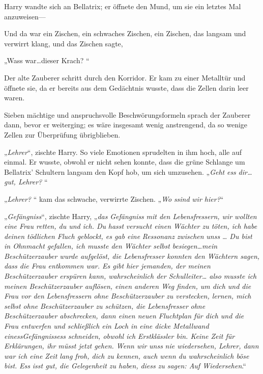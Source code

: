 {Harry wandte sich an Bellatrix; er öffnete den Mund, um sie ein letztes Mal anzuweisen—

Und da war ein Zischen, ein schwaches Zischen, ein Zischen, das langsam und verwirrt klang, und das Zischen sagte,

„Wass war…dieser Krach? “

Der alte Zauberer schritt durch den Korridor. Er kam zu einer Metalltür und öffnete sie, da er bereits aus dem Gedächtnis wusste, dass die Zellen darin leer waren.

Sieben mächtige und anspruchsvolle Beschwörungsformeln sprach der Zauberer dann, bevor er weiterging; es wäre insgesamt wenig anstrengend, da so wenige Zellen zur Überprüfung übrigblieben.

„\emph{Lehrer}“, zischte Harry. So viele Emotionen sprudelten in ihm hoch, alle auf einmal. Er wusste, obwohl er nicht sehen konnte, dass die grüne Schlange um Bellatrix' Schultern langsam den Kopf hob, um sich umzusehen. „\emph{Geht} \emph{ess} \emph{dir… gut, Lehrer?} “

„\emph{Lehrer?} “ kam das schwache, verwirrte Zischen. „\emph{Wo} \emph{ssind} \emph{wir hier?}“

„\emph{Gefängniss}“, zischte Harry, „\emph{das} \emph{Gefängniss} \emph{mit den Lebensfressern, wir wollten eine Frau retten, du und ich. Du} \emph{hasst} \emph{versucht einen Wächter zu töten, ich habe deinen tödlichen Fluch geblockt, es gab eine} \emph{Ressonanz} \emph{zwischen} \emph{unss} \emph{… Du bist in Ohnmacht gefallen, ich musste den Wächter selbst besiegen…mein Beschützerzauber wurde aufgelöst, die Lebensfresser konnten den Wächtern sagen, dass die Frau entkommen war. Es gibt hier jemanden, der meinen Beschützerzauber erspüren kann, wahrscheinlich der Schulleiter… also musste ich meinen Beschützerzauber auflösen, einen anderen Weg finden, um dich und die Frau vor den} \emph{Lebensfressern} \emph{ohne Beschützerzauber zu verstecken, lernen, mich selbst ohne} \emph{Beschützerzauber zu schützen, die} \emph{Lebensfresser} \emph{ohne Beschützerzauber abschrecken, dann einen neuen Fluchtplan für dich und die Frau entwerfen und schließlich ein Loch in eine dicke Metallwand} \emph{einessGefängnissess} \emph{schneiden, obwohl ich Erstklässler bin. Keine Zeit für Erklärungen, ihr müsst jetzt gehen. Wenn wir} \emph{unss} \emph{nie wiedersehen, Lehrer, dann war ich eine Zeit lang froh, dich zu kennen, auch wenn du wahrscheinlich böse bist.} \emph{Ess} \emph{isst gut, die Gelegenheit zu haben,} \emph{diess} \emph{zu sagen: Auf Wiedersehen}.“

}
